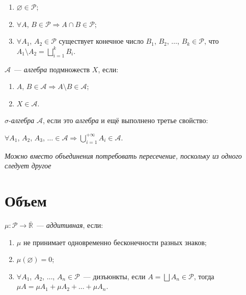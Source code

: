\documentclass{article}
\begin{document}
        \begin{enumerate}
        
            \item $\varnothing \in \mathcal{P}$;
            
            \item $\forall A$, $B \in \mathcal{P} \Rightarrow A \cap B \in \mathcal{P}$;
            
            \item $\forall A_1$, $A_2 \in \mathcal{P}$ существует конечное число $B_1$, $B_2$, $\ldots$, $B_k \in \mathcal{P}$, что $A_1 \setminus A_2 =  \bigsqcup\limits^k_{i = 1} B_i$.
            
        \end{enumerate}
    
        $\mathcal{A}$~--- \textit{алгебра} подмножеств $X$, если:
        
        \begin{enumerate}
        
            \item $A$, $B \in \mathcal{A} \Rightarrow A \setminus B \in \mathcal{A}$;
            
            \item $X \in \mathcal{A}$.
            
        \end{enumerate}
        
        $\sigma$-\textit{алгебра} $\mathcal{A}$, если это \textit{алгебра} и ещё выполнено третье свойство:
        
            $\forall A_1$, $A_2$, $A_3$, $\ldots \in \mathcal{A} \Rightarrow \bigcup\limits_{i = 1}^{+\infty} A_i \in \mathcal{A}$.
            
        \textit{Можно вместо объединения потребовать пересечение, поскольку из одного следует другое}
        
    \newpage
    
    \section{Объем}
    
        $\mu : \mathcal{P} \rightarrow \overline{\mathbb{R}}$~--- \textit{аддитивная}, если:
        
        \begin{enumerate}
        
            \item $\mu$ не принимает одновременно бесконечности разных знаков;
            
            \item $\mu(\varnothing) = 0$;
            
            \item $\forall A_1$, $A_2$, $\ldots$, $A_n \in \mathcal{P}$~--- дизъюнкты, если $A = \bigsqcup A_n \in \mathcal{P}$, тогда $\mu A = \mu A_1 + \mu A_2 + \ldots + \mu A_n$.
        
        \end{enumerate}
        
\end{document}
